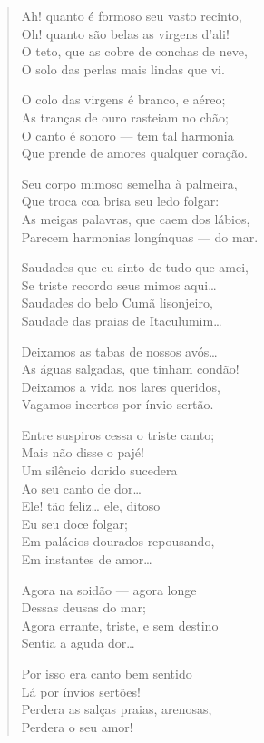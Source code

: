 \begin{verse}
Ah! quanto é formoso seu vasto recinto,\\
Oh! quanto são belas as virgens d'ali!\\
O teto, que as cobre de conchas de neve,\\
O solo das perlas mais lindas que vi.

O colo das virgens é branco, e aéreo;\\
As tranças de ouro rasteiam no chão;\\
O canto é sonoro --- tem tal harmonia\\
Que prende de amores qualquer coração.

Seu corpo mimoso semelha à palmeira,\\
Que troca coa brisa seu ledo folgar:\\
As meigas palavras, que caem dos lábios,\\
Parecem harmonias longínquas --- do mar.

Saudades que eu sinto de tudo que amei,\\
Se triste recordo seus mimos aqui\ldots{}\\
Saudades do belo Cumã lisonjeiro,\\
Saudade das praias de Itaculumim\ldots{}

Deixamos as tabas de nossos avós\ldots{}\\
As águas salgadas, que tinham condão!\\
Deixamos a vida nos lares queridos,\\
Vagamos incertos por ínvio sertão.

Entre suspiros cessa o triste canto;\\
Mais não disse o pajé!\\
Um silêncio dorido sucedera\\
Ao seu canto de dor\ldots{}\\
Ele! tão feliz\ldots{} ele, ditoso\\
Eu seu doce folgar;\\
Em palácios dourados repousando,\\
Em instantes de amor\ldots{}

Agora na soidão --- agora longe\\
Dessas deusas do mar;\\
Agora errante, triste, e sem destino\\
Sentia a aguda dor\ldots{}

Por isso era canto bem sentido\\
Lá por ínvios sertões!\\
Perdera as salças praias, arenosas,\\
Perdera o seu amor!


\end{verse}
